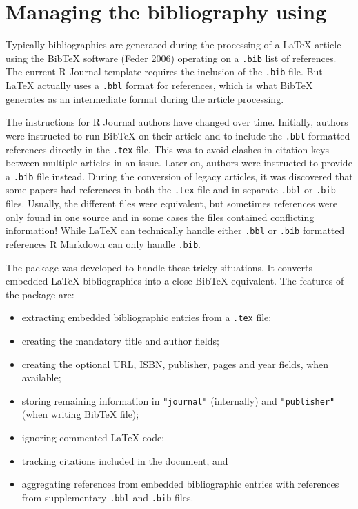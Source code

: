 \hypertarget{rebib}{%
\section{\texorpdfstring{Managing the bibliography using }{Managing the bibliography using }}\label{rebib}}

Typically bibliographies are generated during the processing of a LaTeX article using the BibTeX software (Feder 2006) operating on a \texttt{.bib} list of references. The current R Journal template requires the inclusion of the \texttt{.bib} file. But LaTeX actually uses a \texttt{.bbl} format for references, which is what BibTeX generates as an intermediate format during the article processing.

The instructions for R Journal authors have changed over time. Initially, authors were instructed to run BibTeX on their article and to include the \texttt{.bbl} formatted references directly in the \texttt{.tex} file. This was to avoid clashes in citation keys between multiple articles in an issue. Later on, authors were instructed to provide a \texttt{.bib} file instead.
During the conversion of legacy articles, it was discovered that some papers had references in both the \texttt{.tex} file and in separate \texttt{.bbl} or \texttt{.bib} files. Usually, the different files were equivalent, but sometimes references were only found in one source and in some cases the files contained conflicting information! While LaTeX can technically handle either \texttt{.bbl} or \texttt{.bib} formatted references R Markdown can only handle \texttt{.bib}.

The  package was developed to handle these tricky situations. It converts embedded LaTeX bibliographies into a close BibTeX equivalent. The features of the package are:

\begin{itemize}
\tightlist
\item
  extracting embedded bibliographic entries from a \texttt{.tex} file;
\item
  creating the mandatory title and author fields;
\item
  creating the optional URL, ISBN, publisher, pages and year fields, when available;
\item
  storing remaining information in \texttt{"journal"} (internally) and \texttt{"publisher"} (when writing BibTeX file);
\item
  ignoring commented LaTeX code;
\item
  tracking citations included in the document, and
\item
  aggregating references from embedded bibliographic entries with references from supplementary \texttt{.bbl} and \texttt{.bib} files.
\end{itemize}

